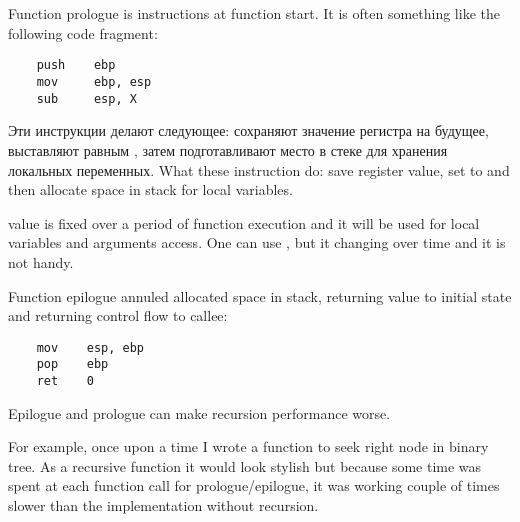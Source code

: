 ﻿\section{}
\label{sec:prologepilog}

{Function prologue is instructions at function start. It is often something like the following
code fragment:}

\begin{lstlisting}
    push    ebp
    mov     ebp, esp
    sub     esp, X
\end{lstlisting}

\IFRU
{Эти инструкции делают следующее: сохраняют значение регистра \EBP на будущее, выставляют \EBP равным \ESP, 
затем подготавливают место в стеке для хранения локальных переменных.}
{What these instruction do: save \EBP register value, set \EBP to \ESP and then allocate space in stack 
for local variables.}

{\EBP value is fixed over a period of function execution and it will be used for local variables and 
arguments access. 
One can use \ESP, but it changing over time and it is not handy.}

{Function epilogue annuled allocated space in stack, returning \EBP value to initial state 
and returning control flow to callee:}

\begin{lstlisting}
    mov    esp, ebp
    pop    ebp
    ret    0
\end{lstlisting}

{Epilogue and prologue can make recursion performance worse.

For example, once upon a time I wrote a function to seek right node in binary tree. 
As a recursive function it would look stylish but because some time was spent at each function call
for prologue/epilogue, it was working couple of times slower than the implementation 
without recursion.}

